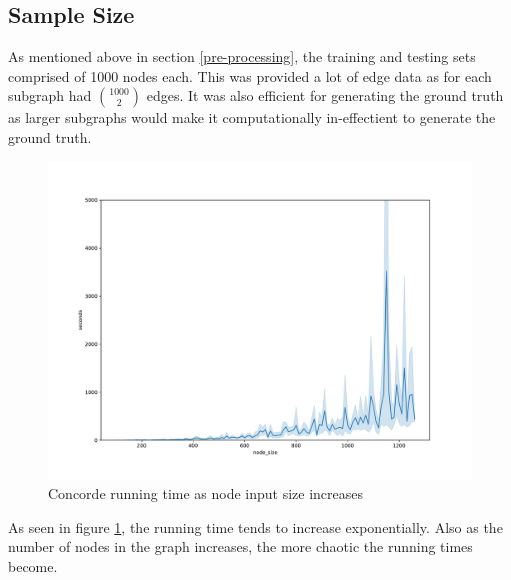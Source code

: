 \documentclass[]{UCD_CS_FYP_Report}
\begin{document}
\subsection{Sample Size}\label{sample-size}
As mentioned above in section \ref{pre-processing}, the training and testing sets comprised of 1000 nodes each. This was provided a lot of edge data as for each subgraph had $1000 \choose 2$ edges. It was also efficient for generating the ground truth as larger subgraphs would make it computationally in-effectient to generate the ground truth. \begin{figure}[h]
    \centering
  \includegraphics[width=1\linewidth]{Figures/runtime.pdf}
  \caption{Concorde running time as node input size increases}
  \label{fig:runtime}
\end{figure}

As seen in figure \ref{fig:runtime}, the running time tends to increase exponentially. Also as the number of nodes in the graph increases, the more chaotic the running times become.

\newpage
\end{document}

